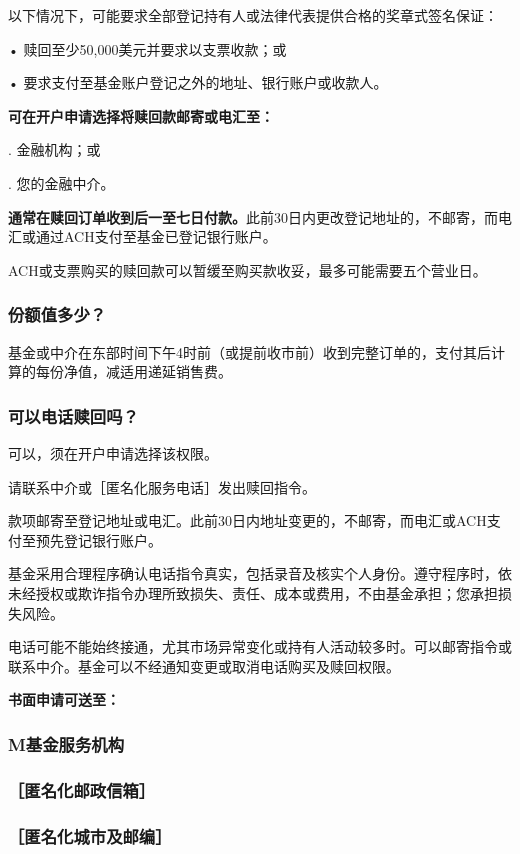 \documentclass[UTF8,fontset=none,11pt,a4paper]{ctexart}
\begin{document}
以下情况下，可能要求全部登记持有人或法律代表提供合格的奖章式签名保证：

\noindent • 赎回至少50,000美元并要求以支票收款；或\par\smallskip
\noindent • 要求支付至基金账户登记之外的地址、银行账户或收款人。\par\smallskip

\par{}\label{originalpage19}
\textbf{可在开户申请选择将赎回款邮寄或电汇至：}

. 金融机构；或


. 您的金融中介。


\textbf{通常在赎回订单收到后一至七日付款。}此前30日内更改登记地址的，不邮寄，而电汇或通过ACH支付至基金已登记银行账户。

ACH或支票购买的赎回款可以暂缓至购买款收妥，最多可能需要五个营业日。

\subsubsection*{份额值多少？}
基金或中介在东部时间下午4时前（或提前收市前）收到完整订单的，支付其后计算的每份净值，减适用递延销售费。

\subsubsection*{可以电话赎回吗？}
可以，须在开户申请选择该权限。

请联系中介或［匿名化服务电话］发出赎回指令。

款项邮寄至登记地址或电汇。此前30日内地址变更的，不邮寄，而电汇或ACH支付至预先登记银行账户。

基金采用合理程序确认电话指令真实，包括录音及核实个人身份。遵守程序时，依未经授权或欺诈指令办理所致损失、责任、成本或费用，不由基金承担；您承担损失风险。

电话可能不能始终接通，尤其市场异常变化或持有人活动较多时。可以邮寄指令或联系中介。基金可以不经通知变更或取消电话购买及赎回权限。

\textbf{书面申请可送至：}

\subsubsection*{M基金服务机构}
\subsubsection*{［匿名化邮政信箱］}
\subsubsection*{［匿名化城市及邮编］}
\end{document}
